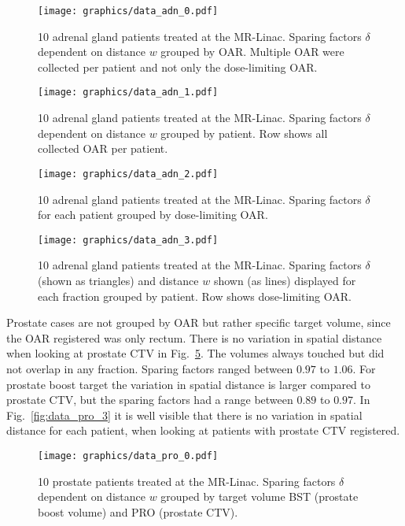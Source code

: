 \documentclass[\relativeRoot/ada.tex]{subfiles}
\begin{document}
\begin{figure}[!htb]
    \centering
    \texttt{[image: graphics/data\_adn\_0.pdf]}
    \caption{10 adrenal gland patients treated at the MR-Linac. Sparing factors $\delta$ dependent on distance $w$ grouped by OAR. Multiple OAR were collected per patient and not only the dose-limiting OAR.}
    \label{fig:data_adn_0}
\end{figure}

\begin{figure}[!htb]
    \centering
    \texttt{[image: graphics/data\_adn\_1.pdf]}
    \caption{10 adrenal gland patients treated at the MR-Linac. Sparing factors $\delta$ dependent on distance $w$ grouped by patient. Row shows all collected OAR per patient.}
    \label{fig:data_adn_1}
\end{figure}

\begin{figure}[!htb]
    \centering
    \texttt{[image: graphics/data\_adn\_2.pdf]}
    \caption{10 adrenal gland patients treated at the MR-Linac. Sparing factors $\delta$ for each patient grouped by dose-limiting OAR.}
    \label{fig:data_adn_2}
\end{figure}

\begin{figure}[!htb]
    \centering
    \texttt{[image: graphics/data\_adn\_3.pdf]}
    \caption{10 adrenal gland patients treated at the MR-Linac. Sparing factors $\delta$ (shown as triangles) and distance $w$ shown (as lines) displayed for each fraction grouped by patient. Row shows dose-limiting OAR.}
    \label{fig:data_adn_3}
\end{figure}

Prostate cases are not grouped by OAR but rather specific target volume, since the OAR registered was only rectum. There is no variation in spatial distance when looking at prostate CTV in Fig.~\ref{fig:data_pro_0}. The volumes always touched but did not overlap in any fraction. Sparing factors ranged between $0.97$ to $1.06$. For prostate boost target the variation in spatial distance is larger compared to prostate CTV, but the sparing factors had a range between $0.89$ to $0.97$. In Fig.~\ref{fig:data_pro_3} it is well visible that there is no variation in spatial distance for each patient, when looking at patients with prostate CTV registered.

\begin{figure}[!htb]
    \centering
    \texttt{[image: graphics/data\_pro\_0.pdf]}
    \caption{10 prostate patients treated at the MR-Linac. Sparing factors $\delta$ dependent on distance $w$ grouped by target volume BST (prostate boost volume) and PRO (prostate CTV).}
    \label{fig:data_pro_0}
\end{figure}
\end{document}
